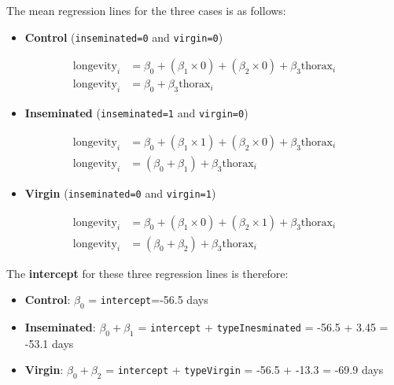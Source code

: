 \documentclass[]{book}
\providecommand{\tightlist}{%
  \setlength{\itemsep}{0pt}\setlength{\parskip}{0pt}}
\theoremstyle{definition}
\theoremstyle{definition}
\theoremstyle{definition}
\theoremstyle{remark}
\begin{document}
The mean regression lines for the three cases is as follows:

\begin{itemize}
\tightlist
\item
  \textbf{Control} (\texttt{inseminated=0} and \texttt{virgin=0})
\end{itemize}

\[
\begin{aligned}
    \mathrm{longevity}_i & = \beta_0 + (\beta_1 \times 0) + (\beta_2 \times 0) + \beta_3\mathrm{thorax}_i\\
        \mathrm{longevity}_i & = \beta_0 + \beta_3\mathrm{thorax}_i
\end{aligned}
\]

\begin{itemize}
\tightlist
\item
  \textbf{Inseminated} (\texttt{inseminated=1} and \texttt{virgin=0})
\end{itemize}

\[
\begin{aligned}
    \mathrm{longevity}_i & = \beta_0 + (\beta_1 \times 1) + (\beta_2 \times 0) + \beta_3\mathrm{thorax}_i\\
        \mathrm{longevity}_i & = (\beta_0 + \beta_1) + \beta_3\mathrm{thorax}_i
\end{aligned}
\]

\begin{itemize}
\tightlist
\item
  \textbf{Virgin} (\texttt{inseminated=0} and \texttt{virgin=1})
\end{itemize}

\[
\begin{aligned}
    \mathrm{longevity}_i & = \beta_0 + (\beta_1 \times 0) + (\beta_2 \times 1) + \beta_3\mathrm{thorax}_i\\
        \mathrm{longevity}_i & = (\beta_0 + \beta_2) + \beta_3\mathrm{thorax}_i
\end{aligned}
\]

The \textbf{intercept} for these three regression lines is therefore:

\begin{itemize}
\tightlist
\item
  \textbf{Control}: \(\beta_0\) = \texttt{intercept}=-56.5 days
\item
  \textbf{Inseminated}: \(\beta_0 + \beta_1\) = \texttt{intercept} +
  \texttt{typeInesminated} = -56.5 + 3.45 = -53.1 days
\item
  \textbf{Virgin}: \(\beta_0 + \beta_2\) = \texttt{intercept} +
  \texttt{typeVirgin} = -56.5 + -13.3 = -69.9 days
\end{itemize}
\end{document}
